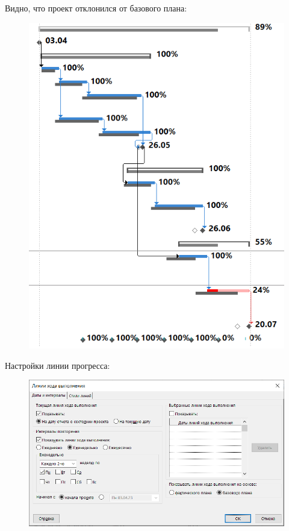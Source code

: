 Видно, что проект отклонился от базового плана:

\begin{figure}[H]
	\begin{center}
		\includegraphics[width=\textwidth]{imgs/task_10_6.png}
	\end{center}
\end{figure}

Настройки линии прогресса:

\begin{figure}[H]
	\begin{center}
		\includegraphics[width=\textwidth]{imgs/task_10_7.png}
	\end{center}
\end{figure}


